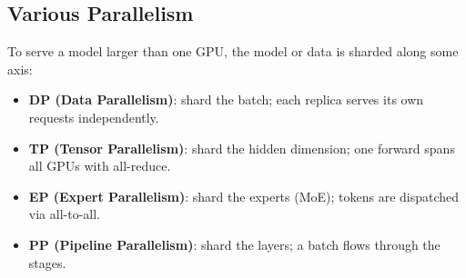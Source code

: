\documentclass{article}
\begin{document}
\subsection{Various Parallelism}
To serve a model larger than one GPU, the model or data is sharded along some axis:
\begin{itemize}
    \item \textbf{DP (Data Parallelism)}: shard the batch; each replica serves its own requests independently.
    \item \textbf{TP (Tensor Parallelism)}: shard the hidden dimension; one forward spans all GPUs with all-reduce.
    \item \textbf{EP (Expert Parallelism)}: shard the experts (MoE); tokens are dispatched via all-to-all.
    \item \textbf{PP (Pipeline Parallelism)}: shard the layers; a batch flows through the stages.
\end{itemize}
\end{document}
